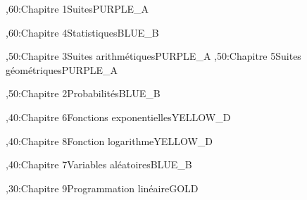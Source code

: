 \documentclass[tikz]{standalone}
\begin{document}
%
	\begin{chart}
	,60:{Chapitre 1}{Suites}{}{PURPLE_A}
	
	,60:{Chapitre 4}{Statistiques}{}{BLUE_B}
	
	,50:{Chapitre 3}{Suites arithmétiques}{}{PURPLE_A}
	,50:{Chapitre 5}{Suites géométriques}{}{PURPLE_A}
	
	,50:{Chapitre 2}{Probabilités}{}{BLUE_B}
	
	,40:{Chapitre 6}{Fonctions exponentielles}{}{YELLOW_D}
	
	,40:{Chapitre 8}{Fonction logarithme}{}{YELLOW_D}
	
	,40:{Chapitre 7}{Variables aléatoires}{}{BLUE_B}
	
	,30:{Chapitre 9}{Programmation linéaire}{}{GOLD}
	
	
	
	
	
	
	
	
	

	
	
	
	
	
	
	\end{chart}
%
\end{document}
